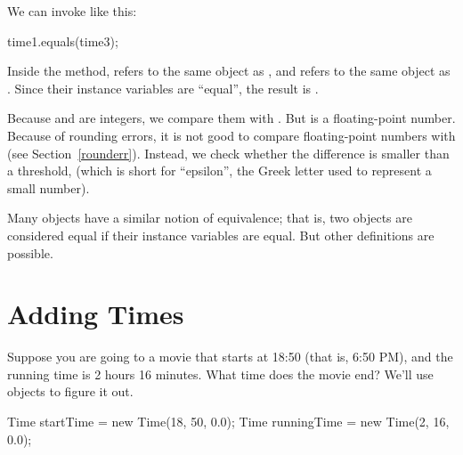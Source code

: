 We can invoke  like this:

\begin{code}
time1.equals(time3);
\end{code}

Inside the  method,  refers to the same object as , and  refers to the same object as .
Since their instance variables are ``equal'', the result is .

Because  and  are integers, we compare them with \java{==}.  
But  is a floating-point number.  
Because of rounding errors, it is not good to compare floating-point numbers with \java{==} (see Section~\ref{rounderr}).
Instead, we check whether the difference is smaller than a threshold,  (which is short for ``epsilon'', the Greek letter used to represent a small number).

Many objects have a similar notion of equivalence; that is, two objects are considered equal if their instance variables are equal.
But other definitions are possible.



%
%


\section{Adding Times}
\label{addingtime}

Suppose you are going to a movie that starts at 18:50 (that is, 6:50 PM), and the running time is 2 hours 16 minutes.
What time does the movie end?
We'll use  objects to figure it out.

\begin{code}
Time startTime = new Time(18, 50, 0.0);
Time runningTime = new Time(2, 16, 0.0);
\end{code}


